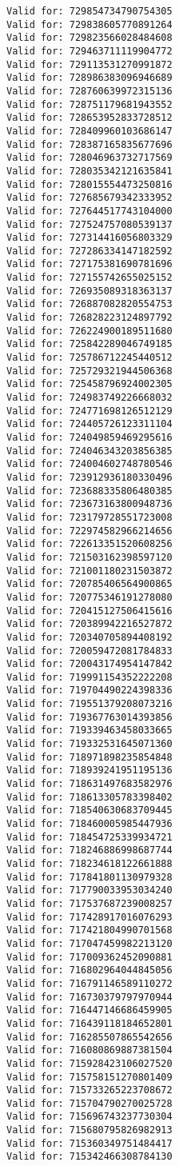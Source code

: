 \documentclass[11pt]{article}
\begin{document}
\begin{Verbatim}[commandchars=\\\{\}]
Valid for: 729854734790754305
Valid for: 729838605770891264
Valid for: 729823566028484608
Valid for: 729463711119904772
Valid for: 729113531270991872
Valid for: 728986383096946689
Valid for: 728760639972315136
Valid for: 728751179681943552
Valid for: 728653952833728512
Valid for: 728409960103686147
Valid for: 728387165835677696
Valid for: 728046963732717569
Valid for: 728035342121635841
Valid for: 728015554473250816
Valid for: 727685679342333952
Valid for: 727644517743104000
Valid for: 727524757080539137
Valid for: 727314416056803329
Valid for: 727286334147182592
Valid for: 727175381690781696
Valid for: 727155742655025152
Valid for: 726935089318363137
Valid for: 726887082820554753
Valid for: 726828223124897792
Valid for: 726224900189511680
Valid for: 725842289046749185
Valid for: 725786712245440512
Valid for: 725729321944506368
Valid for: 725458796924002305
Valid for: 724983749226668032
Valid for: 724771698126512129
Valid for: 724405726123311104
Valid for: 724049859469295616
Valid for: 724046343203856385
Valid for: 724004602748780546
Valid for: 723912936180330496
Valid for: 723688335806480385
Valid for: 723673163800948736
Valid for: 723179728551723008
Valid for: 722974582966214656
Valid for: 722613351520608256
Valid for: 721503162398597120
Valid for: 721001180231503872
Valid for: 720785406564900865
Valid for: 720775346191278080
Valid for: 720415127506415616
Valid for: 720389942216527872
Valid for: 720340705894408192
Valid for: 720059472081784833
Valid for: 720043174954147842
Valid for: 719991154352222208
Valid for: 719704490224398336
Valid for: 719551379208073216
Valid for: 719367763014393856
Valid for: 719339463458033665
Valid for: 719332531645071360
Valid for: 718971898235854848
Valid for: 718939241951195136
Valid for: 718631497683582976
Valid for: 718613305783398402
Valid for: 718540630683709445
Valid for: 718460005985447936
Valid for: 718454725339934721
Valid for: 718246886998687744
Valid for: 718234618122661888
Valid for: 717841801130979328
Valid for: 717790033953034240
Valid for: 717537687239008257
Valid for: 717428917016076293
Valid for: 717421804990701568
Valid for: 717047459982213120
Valid for: 717009362452090881
Valid for: 716802964044845056
Valid for: 716791146589110272
Valid for: 716730379797970944
Valid for: 716447146686459905
Valid for: 716439118184652801
Valid for: 716285507865542656
Valid for: 716080869887381504
Valid for: 715928423106027520
Valid for: 715758151270801409
Valid for: 715733265223708672
Valid for: 715704790270025728
Valid for: 715696743237730304
Valid for: 715680795826982913
Valid for: 715360349751484417
Valid for: 715342466308784130

\end{Verbatim}
\end{document}

